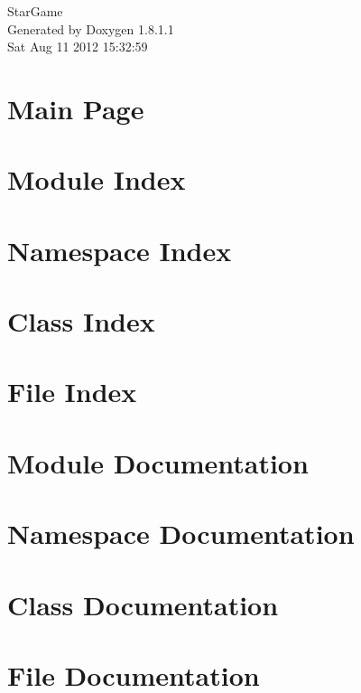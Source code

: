 \documentclass{book}
\begin{document}
\hypersetup{pageanchor=false,citecolor=blue}
\begin{titlepage}
\vspace*{7cm}
\begin{center}
{\Large Star\-Game }\\
\vspace*{1cm}
{\large Generated by Doxygen 1.8.1.1}\\
\vspace*{0.5cm}
{\small Sat Aug 11 2012 15:32:59}\\
\end{center}
\end{titlepage}
\clearemptydoublepage
{}
\tableofcontents
\clearemptydoublepage
{}
\hypersetup{pageanchor=true,citecolor=blue}
\chapter{Main Page}
\label{index}\hypertarget{index}{}
\chapter{Module Index}

\chapter{Namespace Index}

\chapter{Class Index}

\chapter{File Index}

\chapter{Module Documentation}


\chapter{Namespace Documentation}



\chapter{Class Documentation}


















\chapter{File Documentation}










\printindex
\end{document}
